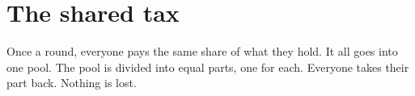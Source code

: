 \section{The shared tax}

Once a round, everyone pays the same share of what they hold.
It all goes into one pool.
The pool is divided into equal parts, one for each.
Everyone takes their part back. Nothing is lost.
